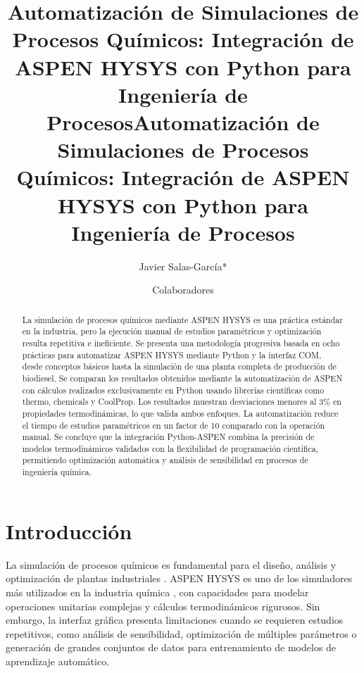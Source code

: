 \documentclass{syx7}
\title{Automatización de Simulaciones de Procesos Químicos: Integración de ASPEN HYSYS con Python para Ingeniería de Procesos}
\begin{document}
\title{Automatización de Simulaciones de Procesos Químicos: Integración de ASPEN HYSYS con Python para Ingeniería de Procesos}
\author{Javier Salas-García*}
\author{Colaboradores}

\vspace*{-1 \baselineskip}

\maketitle

\begin{abstract}
La simulación de procesos químicos mediante ASPEN HYSYS es una práctica estándar en la industria, pero la ejecución manual de estudios paramétricos y optimización resulta repetitiva e ineficiente. Se presenta una metodología progresiva basada en ocho prácticas para automatizar ASPEN HYSYS mediante Python y la interfaz COM, desde conceptos básicos hasta la simulación de una planta completa de producción de biodiesel. Se comparan los resultados obtenidos mediante la automatización de ASPEN con cálculos realizados exclusivamente en Python usando librerías científicas como thermo, chemicals y CoolProp. Los resultados muestran desviaciones menores al 3\% en propiedades termodinámicas, lo que valida ambos enfoques. La automatización reduce el tiempo de estudios paramétricos en un factor de 10 comparado con la operación manual. Se concluye que la integración Python-ASPEN combina la precisión de modelos termodinámicos validados con la flexibilidad de programación científica, permitiendo optimización automática y análisis de sensibilidad en procesos de ingeniería química.
\end{abstract}

\section{Introducción}

La simulación de procesos químicos es fundamental para el diseño, análisis y optimización de plantas industriales \cite{seider2016product,turton2018analysis}. ASPEN HYSYS es uno de los simuladores más utilizados en la industria química \cite{aspentech2020hysys}, con capacidades para modelar operaciones unitarias complejas y cálculos termodinámicos rigurosos. Sin embargo, la interfaz gráfica presenta limitaciones cuando se requieren estudios repetitivos, como análisis de sensibilidad, optimización de múltiples parámetros o generación de grandes conjuntos de datos para entrenamiento de modelos de aprendizaje automático.
\end{document}

